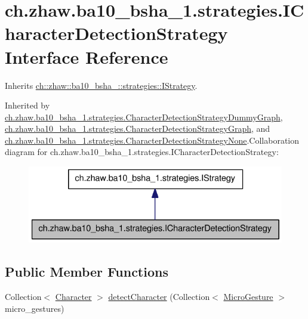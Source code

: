 \hypertarget{interfacech_1_1zhaw_1_1ba10__bsha__1_1_1strategies_1_1ICharacterDetectionStrategy}{
\section{ch.zhaw.ba10\_\-bsha\_\-1.strategies.ICharacterDetectionStrategy Interface Reference}
\label{interfacech_1_1zhaw_1_1ba10__bsha__1_1_1strategies_1_1ICharacterDetectionStrategy}
}


Inherits \hyperlink{interfacech_1_1zhaw_1_1ba10__bsha__1_1_1strategies_1_1IStrategy}{ch::zhaw::ba10\_\-bsha\_::strategies::IStrategy}.

Inherited by \hyperlink{classch_1_1zhaw_1_1ba10__bsha__1_1_1strategies_1_1CharacterDetectionStrategyDummyGraph}{ch.zhaw.ba10\_\-bsha\_\-1.strategies.CharacterDetectionStrategyDummyGraph}, \hyperlink{classch_1_1zhaw_1_1ba10__bsha__1_1_1strategies_1_1CharacterDetectionStrategyGraph}{ch.zhaw.ba10\_\-bsha\_\-1.strategies.CharacterDetectionStrategyGraph}, and \hyperlink{classch_1_1zhaw_1_1ba10__bsha__1_1_1strategies_1_1CharacterDetectionStrategyNone}{ch.zhaw.ba10\_\-bsha\_\-1.strategies.CharacterDetectionStrategyNone}.Collaboration diagram for ch.zhaw.ba10\_\-bsha\_\-1.strategies.ICharacterDetectionStrategy:\nopagebreak
\begin{figure}[H]
\begin{center}
\leavevmode
\includegraphics[width=328pt]{interfacech_1_1zhaw_1_1ba10__bsha__1_1_1strategies_1_1ICharacterDetectionStrategy__coll__graph}
\end{center}
\end{figure}
\subsection*{Public Member Functions}
\begin{DoxyCompactItemize}
\item 
Collection$<$ \hyperlink{classch_1_1zhaw_1_1ba10__bsha__1_1_1Character}{Character} $>$ \hyperlink{interfacech_1_1zhaw_1_1ba10__bsha__1_1_1strategies_1_1ICharacterDetectionStrategy_a994429a274e75c471d18aca69dce2c1d}{detectCharacter} (Collection$<$ \hyperlink{classch_1_1zhaw_1_1ba10__bsha__1_1_1service_1_1MicroGesture}{MicroGesture} $>$ micro\_\-gestures)
\end{DoxyCompactItemize}


